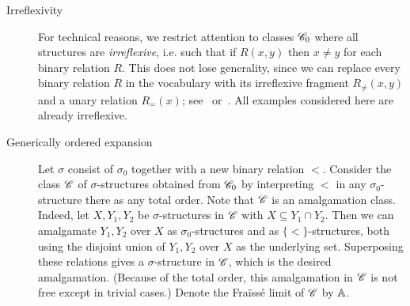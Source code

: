 \begin{description}
    \item[Irreflexivity] 
    For technical reasons, we restrict attention to classes $\mathscr{C}_0$ where all structures are {\em irreflexive}, i.e. such that if $R(x,y)$ then $x\neq y$ for each binary relation $R$.
    This does not lose generality, since we can replace every binary relation $R$ in the vocabulary with its irreflexive fragment $R_{\neq}(x,y)$ and a unary relation $R_=(x)$; see~\cite[Sec.~2.4]{Herwig1998} or~\cite[p.~121]{SS20}.
    All examples considered here are already irreflexive.
    
    \item[Generically ordered expansion] 
    Let $\sigma$ consist of $\sigma_0$ together with a new binary relation $<$.
    Consider the class $\mathscr{C}$ of $\sigma$-structures obtained from $\mathscr{C}_0$ 
    by interpreting $<$ in any $\sigma_0$-structure there as any total order.
    Note that $\mathscr{C}$ is an amalgamation class.
    Indeed, let $X, Y_1, Y_2$ be $\sigma$-structures in $\mathscr{C}$ with $X \subseteq Y_1 \cap Y_2$.
    Then we can amalgamate $Y_1, Y_2$ over $X$ as $\sigma_0$-structures and as $\{<\}$-structures, 
    both using the disjoint union of $Y_1, Y_2$ over $X$ as the underlying set. 
    Superposing these relations gives a $\sigma$-structure in $\mathscr{C}$, which is the desired amalgamation.
    (Because of the total order, this amalgamation in $\mathscr{C}$ is not free except in trivial cases.)
    Denote the Fraïssé limit of $\mathscr{C}$ by $\mathbb{A}$.    
\end{description}




